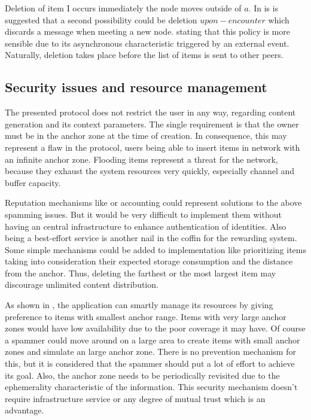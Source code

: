 Deletion of item I occurs immediately the node moves outside of $a$. In
\cite{percomfloatingcontent} is is suggested that a second possibility could be
deletion $upon-encounter$ which discards a message when meeting a new node.
stating that this policy is more sensible due to its asynchronous
characteristic triggered by an external event. Naturally, deletion takes place
before the list of items is sent to other peers.

\subsection{Security issues and resource management}

The presented protocol does not restrict the user in any way, regarding content
generation and its context parameters. The single requirement is that the owner
must be in the anchor zone at the time of creation. In consequence, this may
represent a flaw in the protocol, users being able to insert items in network
with an infinite anchor zone. Flooding items represent a threat for the network,
because they exhaust the system resources very quickly, especially channel and
buffer capacity.

Reputation mechanisms like \cite{reputation} or accounting could represent
solutions to the above spamming issues. But it would be very difficult to
implement them without having an central infrastructure to enhance
authentication of identities. Also being a best-effort service is another nail
in the coffin for the rewarding system. Some simple mechanisms could be added to
implementation like prioritizing items taking into consideration their expected
storage consumption and the distance from the anchor. Thus, deleting the
farthest or the most largest item may discourage unlimited content distribution.

As shown in \cite{percomfloatingcontent}, the application can smartly manage its
resources by giving preference to items with smallest anchor range. Items with
very large anchor zones would have low availability due to the poor coverage it
may have. Of course a spammer could move around on a large area to create items
with small anchor zones and simulate an large anchor zone. There is no
prevention mechanism for this, but it is considered that the spammer should put
a lot of effort to achieve its goal. Also, the anchor zone needs to be
periodically revisited due to the ephemerality characteristic of the
information.
This security mechanism doesn't require infrastructure service or any degree of
mutual trust which is an advantage.



